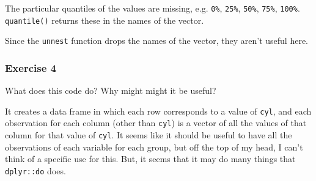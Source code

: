 \documentclass[]{book}
\newenvironment{Shaded}{\begin{snugshade}}{\end{snugshade}}
\newcommand{\CommentTok}[1]{\textcolor[rgb]{0.56,0.35,0.01}{\textit{#1}}}
\newcommand{\KeywordTok}[1]{\textcolor[rgb]{0.13,0.29,0.53}{\textbf{#1}}}
\newcommand{\NormalTok}[1]{#1}
\newcommand{\OperatorTok}[1]{\textcolor[rgb]{0.81,0.36,0.00}{\textbf{#1}}}
\newcommand{\StringTok}[1]{\textcolor[rgb]{0.31,0.60,0.02}{#1}}
\theoremstyle{plain}
\theoremstyle{remark}
\theoremstyle{definition}
\theoremstyle{definition}
\theoremstyle{definition}
\theoremstyle{remark}
\begin{document}
The particular quantiles of the values are missing, e.g. \texttt{0\%},
\texttt{25\%}, \texttt{50\%}, \texttt{75\%}, \texttt{100\%}.
\texttt{quantile()} returns these in the names of the vector.

\begin{Shaded}
\end{Shaded}

Since the \texttt{unnest} function drops the names of the vector, they
aren't useful here.

\hypertarget{exercise-4-39}{%
\subsubsection{Exercise 4}\label{exercise-4-39}}

What does this code do? Why might might it be useful?

\begin{Shaded}
\end{Shaded}

It creates a data frame in which each row corresponds to a value of
\texttt{cyl}, and each observation for each column (other than
\texttt{cyl}) is a vector of all the values of that column for that
value of \texttt{cyl}. It seems like it should be useful to have all the
observations of each variable for each group, but off the top of my
head, I can't think of a specific use for this. But, it seems that it
may do many things that \texttt{dplyr::do} does.
\end{document}
